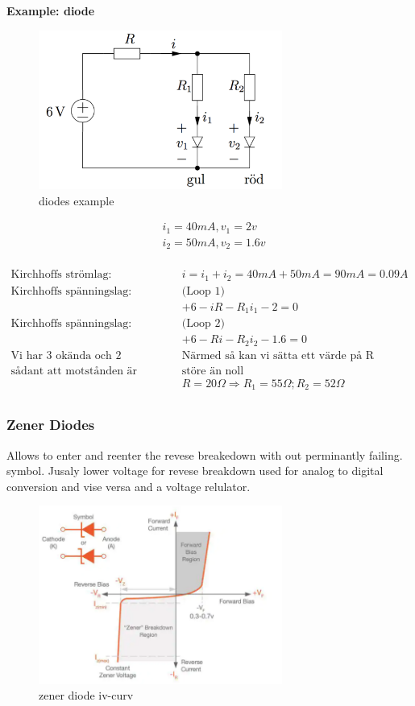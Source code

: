 \documentclass{article}
\begin{document}
\newpage
\textbf{Example: diode}
\begin{figure}[h]
    \centering
    \includegraphics[width=8cm]{image/example-diode.png}
    \caption{diodes example}
\end{figure}

\begin{align*}
    &i_1 = 40mA, v_1 = 2v \\
    &i_2 = 50mA, v_2 = 1.6v \\
\end{align*}

\begin{align*}
    \text{Kirchhoffs strömlag: }& i=i_1+i_2=40mA+50mA=90mA=0.09A \\
    \text{Kirchhoffs spänningslag: }& \text{(Loop 1)} \\
    &+6-iR-R_1i_1-2=0 \\
    \text{Kirchhoffs spänningslag: }& \text{(Loop 2)} \\
    &+6-Ri-R_2i_2-1.6=0 \\
    \text{Vi har 3 okända och 2 eqvationer.}
    &\text{Närmed så kan vi sätta ett värde på R} \\
    \text{sådant att motstånden är} &\text{störe än noll} \\
    &R=20\Omega \Rightarrow R_1 = 55\Omega; R_2 = 52\Omega \\
\end{align*}



\newpage
\subsubsection{Zener Diodes}
Allows to enter and reenter the revese breakedown with out perminantly failing.
symbol. Jusaly lower voltage for revese breakdown
used for analog to digital conversion and vise versa and a voltage relulator.
\begin{figure}[h]
    \centering
    \includegraphics[width=8cm]{image/zener-diode.png}
    \caption{zener diode iv-curv}
\end{figure}
\end{document}

